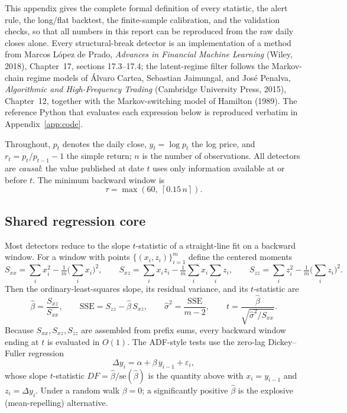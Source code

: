 \documentclass[11pt]{article}
\begin{document}
This appendix gives the complete formal definition of every statistic, the alert rule, the long/flat backtest, the finite-sample calibration, and the validation checks, so that all numbers in this report can be reproduced from the raw daily closes alone. Every structural-break detector is an implementation of a method from Marcos L\'opez de Prado, \emph{Advances in Financial Machine Learning} (Wiley, 2018), Chapter~17, sections 17.3--17.4; the latent-regime filter follows the Markov-chain regime models of \'Alvaro Cartea, Sebastian Jaimungal, and Jos\'e Penalva, \emph{Algorithmic and High-Frequency Trading} (Cambridge University Press, 2015), Chapter~12, together with the Markov-switching model of Hamilton (1989). The reference Python that evaluates each expression below is reproduced verbatim in Appendix~\ref{app:code}.

Throughout, $p_t$ denotes the daily close, $y_t=\log p_t$ the log price, and $r_t = p_t/p_{t-1}-1$ the simple return; $n$ is the number of observations. All detectors are \emph{causal}: the value published at date $t$ uses only information available at or before $t$. The minimum backward window is
\[
    \tau = \max\!\left(60,\ \left\lceil 0.15\,n \right\rceil\right).
\]

\subsection{Shared regression core}

Most detectors reduce to the slope $t$-statistic of a straight-line fit on a backward window. For a window with points $\{(x_i,z_i)\}_{i=1}^{m}$ define the centered moments
\[
    S_{xx}=\sum_i x_i^2-\tfrac{1}{m}\Big(\sum_i x_i\Big)^2,\qquad
    S_{xz}=\sum_i x_i z_i-\tfrac{1}{m}\sum_i x_i\sum_i z_i,\qquad
    S_{zz}=\sum_i z_i^2-\tfrac{1}{m}\Big(\sum_i z_i\Big)^2 .
\]
Then the ordinary-least-squares slope, its residual variance, and its $t$-statistic are
\[
    \hat\beta=\frac{S_{xz}}{S_{xx}},\qquad
    \mathrm{SSE}=S_{zz}-\hat\beta\,S_{xz},\qquad
    \hat\sigma^2=\frac{\mathrm{SSE}}{m-2},\qquad
    t=\frac{\hat\beta}{\sqrt{\hat\sigma^2/S_{xx}}} .
\]
Because $S_{xx},S_{xz},S_{zz}$ are assembled from prefix sums, every backward window ending at $t$ is evaluated in $O(1)$. The ADF-style tests use the zero-lag Dickey--Fuller regression
\[
    \Delta y_i = \alpha + \beta\,y_{i-1} + \varepsilon_i ,
\]
whose slope $t$-statistic $DF=\hat\beta/\mathrm{se}(\hat\beta)$ is the quantity above with $x_i=y_{i-1}$ and $z_i=\Delta y_i$. Under a random walk $\beta=0$; a significantly positive $\hat\beta$ is the explosive (mean-repelling) alternative.
\end{document}
